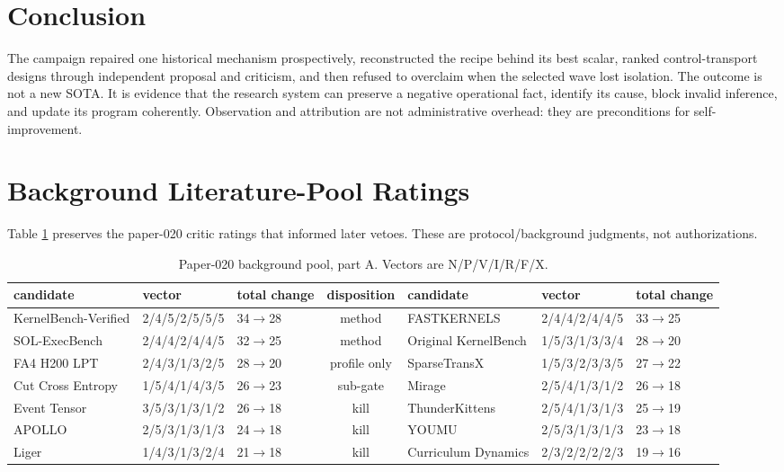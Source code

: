 \documentclass{article}
\begin{document}
\section{Conclusion}

The campaign repaired one historical mechanism prospectively, reconstructed
the recipe behind its best scalar, ranked control-transport designs through
independent proposal and criticism, and then refused to overclaim when the
selected wave lost isolation.  The outcome is not a new SOTA.  It is evidence
that the research system can preserve a negative operational fact, identify
its cause, block invalid inference, and update its program coherently.
Observation and attribution are not administrative overhead: they are
preconditions for self-improvement.

\appendix
\clearpage
\onecolumn
\vspace*{0.7in}
\section{Background Literature-Pool Ratings}

Table \ref{tab:p020poola} preserves the paper-020 critic ratings that informed
later vetoes.  These are protocol/background judgments, not authorizations.

\begin{table}[!ht]
\caption{Paper-020 background pool, part A.  Vectors are N/P/V/I/R/F/X.}
\label{tab:p020poola}
\centering\tiny
\begin{tabular}{lllclll}
\toprule
candidate & vector & total change & disposition &
candidate & vector & total change\\
\midrule
KernelBench-Verified & 2/4/5/2/5/5/5 & 34$\to$28 & method &
FASTKERNELS & 2/4/4/2/4/4/5 & 33$\to$25\\
SOL-ExecBench & 2/4/4/2/4/4/5 & 32$\to$25 & method &
Original KernelBench & 1/5/3/1/3/3/4 & 28$\to$20\\
FA4 H200 LPT & 2/4/3/1/3/2/5 & 28$\to$20 & profile only &
SparseTransX & 1/5/3/2/3/3/5 & 27$\to$22\\
Cut Cross Entropy & 1/5/4/1/4/3/5 & 26$\to$23 & sub-gate &
Mirage & 2/5/4/1/3/1/2 & 26$\to$18\\
Event Tensor & 3/5/3/1/3/1/2 & 26$\to$18 & kill &
ThunderKittens & 2/5/4/1/3/1/3 & 25$\to$19\\
APOLLO & 2/5/3/1/3/1/3 & 24$\to$18 & kill &
YOUMU & 2/5/3/1/3/1/3 & 23$\to$18\\
Liger & 1/4/3/1/3/2/4 & 21$\to$18 & kill &
Curriculum Dynamics & 2/3/2/2/2/2/3 & 19$\to$16\\
\bottomrule
\end{tabular}
\end{table}
\end{document}
